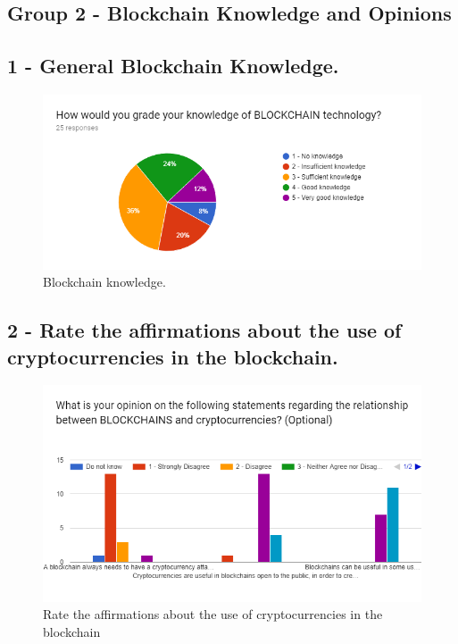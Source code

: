 
\subsection{Group 2 - Blockchain Knowledge and Opinions}

\subsection*{1 - General Blockchain Knowledge.}
 \begin{figure}[h]
\centering
\includegraphics[scale=0.65]{media/blockchain_knowledge.png}
\caption["Blockchain knowledge."]{Blockchain knowledge.}
\label{fig:blockchain_knowledge}
\end{figure}
 
 
\subsection*{2 - Rate the affirmations about the use of cryptocurrencies in the blockchain.}

\begin{figure}[h]
\centering
\includegraphics[scale=0.60]{media/blockchain_crypto_opinions.png}
\caption[Rate the affirmations about the use of cryptocurrencies in the blockchain]{Rate the affirmations about the use of cryptocurrencies in the blockchain}
\label{fig:blockchain_crypto_opinions}
\end{figure}

